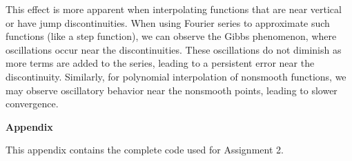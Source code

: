 \documentclass[12pt]{article}
\begin{document}
This effect is more apparent when interpolating functions that are near vertical or have jump discontinuities. When using Fourier series to approximate such functions (like a step function), we can observe the Gibbs phenomenon, where oscillations occur near the discontinuities. These oscillations do not diminish as more terms are added to the series, leading to a persistent error near the discontinuity. Similarly, for polynomial interpolation of nonsmooth functions, we may observe oscillatory behavior near the nonsmooth points, leading to slower convergence.

\newpage
{\Large\textbf{Appendix}}

This appendix contains the complete code used for Assignment 2.


\end{document}
